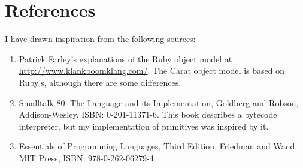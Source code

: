 \section{References}

I have drawn inspiration from the following sources:

\begin{enumerate}
  \item Patrick Farley's explanations of the Ruby object model at \url{http://www.klankboomklang.com/}. The Carat object model is based on Ruby's, although there are some differences.
  
  \item Smalltalk-80: The Language and its Implementation, Goldberg and Robson, Addison-Wesley, ISBN: 0-201-11371-6. This book describes a bytecode interpreter, but my implementation of primitives was inspired by it.
  
  \item Essentials of Programming Languages, Third Edition, Friedman and Wand, MIT Press, ISBN: 978-0-262-06279-4
\end{enumerate}
